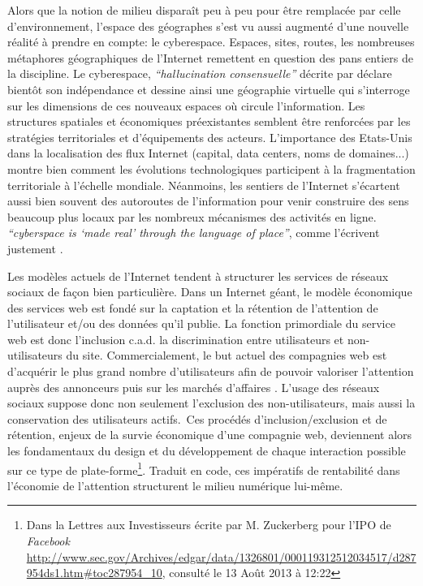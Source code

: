 Alors que la notion de milieu disparaît peu à peu pour être remplacée par celle d’environnement\citep{DAngio2001}, l’espace des géographes s'est vu aussi augmenté d’une nouvelle réalité à prendre en compte: le cyberespace. Espaces, sites, routes, les nombreuses métaphores géographiques de l'Internet remettent en question des pans entiers de la discipline. Le cyberespace, \textit{``hallucination consensuelle''} décrite par \cite{Gibson1984} déclare bientôt son indépendance \citep{Barlow2001} et dessine ainsi une géographie virtuelle \citep{Batty1997} qui s’interroge sur les dimensions de ces nouveaux espaces où circule l’information. Les structures spatiales et économiques préexistantes semblent être renforcées par les stratégies territoriales et d'équipements des acteurs. L’importance des Etats-Unis \citep{Zook2001, Cukier1999} dans la localisation des flux Internet (capital, data centers, noms de domaines...) montre bien comment les évolutions technologiques participent à la fragmentation territoriale à l’échelle mondiale. Néanmoins, les sentiers de l’Internet s’écartent aussi bien souvent des autoroutes de l’information pour venir construire des sens beaucoup plus locaux par les nombreux mécanismes des activités en ligne. \textit{``cyberspace is ‘made real’ through the language of place''}, comme l’écrivent justement \cite{Dodge2007}.

Les modèles actuels de l’Internet tendent à structurer les services de réseaux sociaux de façon bien particulière. Dans un Internet géant, le modèle économique des services web est fondé sur la captation et la rétention de l'attention de l'utilisateur et/ou des données qu'il publie. La fonction primordiale du service web est donc l'inclusion c.a.d. la discrimination entre utilisateurs et non-utilisateurs du site. Commercialement, le but actuel des compagnies web est d'acquérir le plus grand nombre d'utilisateurs afin de pouvoir valoriser l’attention auprès des annonceurs puis sur les marchés d’affaires \citep{Ries2011}. L'usage des réseaux sociaux suppose donc non seulement l'exclusion des non-utilisateurs, mais aussi la conservation des utilisateurs actifs. Ces procédés d'inclusion/exclusion et de rétention, enjeux de la survie économique d'une compagnie web, deviennent alors les fondamentaux du design et du développement de chaque interaction possible sur ce type de plate-forme\footnote{Dans la Lettres aux Investisseurs écrite par M. Zuckerberg  pour l’IPO de \textit{Facebook} \url{http://www.sec.gov/Archives/edgar/data/1326801/000119312512034517/d287954ds1.htm\#toc287954_10}, consulté le 13 Août 2013 à 12:22}. Traduit en code, ces impératifs de rentabilité dans l’économie de l’attention structurent le milieu numérique lui-même.

